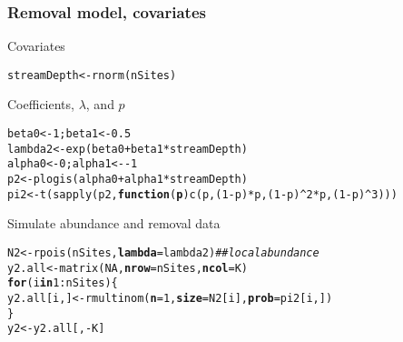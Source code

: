 \documentclass[color=usenames,dvipsnames]{beamer}\usepackage[]{graphicx}\usepackage[]{color}
\makeatletter
\newcommand{\hlnum}[1]{\textcolor[rgb]{0.69,0.494,0}{#1}}%
\newcommand{\hlcom}[1]{\textcolor[rgb]{0.514,0.506,0.514}{\textit{#1}}}%
\newcommand{\hlopt}[1]{\textcolor[rgb]{0,0,0}{#1}}%
\newcommand{\hlstd}[1]{\textcolor[rgb]{0,0,0}{#1}}%
\newcommand{\hlkwa}[1]{\textcolor[rgb]{0,0,0}{\textbf{#1}}}%
\newcommand{\hlkwb}[1]{\textcolor[rgb]{0,0.341,0.682}{#1}}%
\newcommand{\hlkwc}[1]{\textcolor[rgb]{0,0,0}{\textbf{#1}}}%
\newcommand{\hlkwd}[1]{\textcolor[rgb]{0.004,0.004,0.506}{#1}}%
\newenvironment{kframe}{%
 \def\at@end@of@kframe{}%
 \ifinner\ifhmode%
  \def\at@end@of@kframe{\end{minipage}}%
  \begin{minipage}{\columnwidth}%
 \fi\fi%
 \def\FrameCommand##1{\hskip\@totalleftmargin \hskip-\fboxsep
 \colorbox{shadecolor}{##1}\hskip-\fboxsep
     \hskip-\linewidth \hskip-\@totalleftmargin \hskip\columnwidth}%
 \MakeFramed {\advance\hsize-\width
   \@totalleftmargin\z@ \linewidth\hsize
   \@setminipage}}%
 {\par\unskip\endMakeFramed%
 \at@end@of@kframe}
\newenvironment{knitrout}{}{} %
\makeatother
\begin{document}
\begin{frame}[fragile]
  \frametitle{Removal model, covariates}
  \small
  Covariates
  \vspace{-6pt}
\begin{knitrout}\scriptsize
{}\color{fgcolor}\begin{kframe}
\begin{alltt}
\hlstd{streamDepth} \hlkwb{<-} \hlkwd{rnorm}\hlstd{(nSites)}
\end{alltt}
\end{kframe}
\end{knitrout}
\vfill
  Coefficients, $\lambda$, and $p$
  \vspace{-6pt}
\begin{knitrout}\scriptsize
{}\color{fgcolor}\begin{kframe}
\begin{alltt}
\hlstd{beta0} \hlkwb{<-} \hlnum{1}\hlstd{; beta1} \hlkwb{<-} \hlnum{0.5}
\hlstd{lambda2} \hlkwb{<-} \hlkwd{exp}\hlstd{(beta0} \hlopt{+} \hlstd{beta1}\hlopt{*}\hlstd{streamDepth)}
\hlstd{alpha0} \hlkwb{<-} \hlnum{0}\hlstd{; alpha1} \hlkwb{<-} \hlopt{-}\hlnum{1}
\hlstd{p2} \hlkwb{<-} \hlkwd{plogis}\hlstd{(alpha0} \hlopt{+} \hlstd{alpha1}\hlopt{*}\hlstd{streamDepth)}
\hlstd{pi2} \hlkwb{<-} \hlkwd{t}\hlstd{(}\hlkwd{sapply}\hlstd{(p2,} \hlkwa{function}\hlstd{(}\hlkwc{p}\hlstd{)} \hlkwd{c}\hlstd{(p, (}\hlnum{1}\hlopt{-}\hlstd{p)}\hlopt{*}\hlstd{p, (}\hlnum{1}\hlopt{-}\hlstd{p)}\hlopt{^}\hlnum{2}\hlopt{*}\hlstd{p, (}\hlnum{1}\hlopt{-}\hlstd{p)}\hlopt{^}\hlnum{3}\hlstd{)))}
\end{alltt}
\end{kframe}
\end{knitrout}
\vfill
  Simulate abundance and removal data
  \vspace{-6pt}
\begin{knitrout}\scriptsize
{}\color{fgcolor}\begin{kframe}
\begin{alltt}
\hlstd{N2} \hlkwb{<-} \hlkwd{rpois}\hlstd{(nSites,} \hlkwc{lambda}\hlstd{=lambda2)}         \hlcom{## local abundance }
\hlstd{y2.all} \hlkwb{<-} \hlkwd{matrix}\hlstd{(}\hlnum{NA}\hlstd{,} \hlkwc{nrow}\hlstd{=nSites,} \hlkwc{ncol}\hlstd{=K)}
\hlkwa{for}\hlstd{(i} \hlkwa{in} \hlnum{1}\hlopt{:}\hlstd{nSites) \{}
    \hlstd{y2.all[i,]} \hlkwb{<-} \hlkwd{rmultinom}\hlstd{(}\hlkwc{n}\hlstd{=}\hlnum{1}\hlstd{,} \hlkwc{size}\hlstd{=N2[i],} \hlkwc{prob}\hlstd{=pi2[i,])}
\hlstd{\}}
\hlstd{y2} \hlkwb{<-} \hlstd{y2.all[,}\hlopt{-}\hlstd{K]}
\end{alltt}
\end{kframe}
\end{knitrout}
\end{frame}
\end{document}
